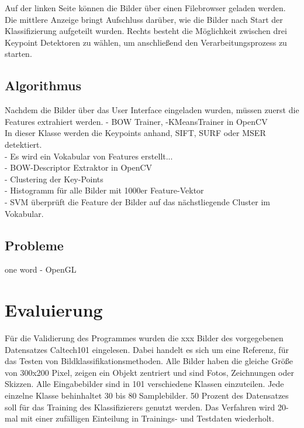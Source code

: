 \documentclass[liststotoc,11pt,a4paper]{article}
\begin{document}

Auf der linken Seite können die Bilder über einen Filebrowser geladen werden. Die mittlere Anzeige bringt Aufschluss darüber, wie die Bilder nach Start der Klassifizierung aufgeteilt wurden. Rechts besteht die Möglichkeit zwischen drei Keypoint Detektoren zu wählen, um anschließend den Verarbeitungsprozess zu starten. %

\subsection{Algorithmus}
Nachdem die Bilder über das User Interface eingeladen wurden, müssen zuerst die Features extrahiert werden. 
- BOW Trainer, -KMeansTrainer in OpenCV\\
In dieser Klasse werden die Keypoints anhand, SIFT, SURF oder MSER detektiert. \\
- Es wird ein Vokabular von Features erstellt...\\ %
- BOW-Descriptor Extraktor in OpenCV\\
- Clustering der Key-Points\\
- Histogramm für alle Bilder mit 1000er Feature-Vektor\\

- SVM überprüft die Feature der Bilder auf das nächstliegende Cluster im Vokabular.\\


\subsection{Probleme}
one word - OpenGL

\section{Evaluierung}
Für die Validierung des Programmes wurden die xxx Bilder des vorgegebenen Datensatzes Caltech101 eingelesen. Dabei handelt es sich um eine Referenz, für das Testen von Bildklassifikationsmethoden. Alle Bilder haben die gleiche Größe von 300x200 Pixel, zeigen ein Objekt zentriert und sind Fotos, Zeichnungen oder Skizzen. Alle Eingabebilder sind in 101 verschiedene Klassen einzuteilen. Jede einzelne Klasse behinhaltet 30 bis 80 Samplebilder. 
50 Prozent des Datensatzes soll für das Training des Klassifizierers genutzt werden. Das Verfahren wird 20-mal mit einer zufälligen Einteilung in Trainings- und Testdaten wiederholt.
\end{document}

